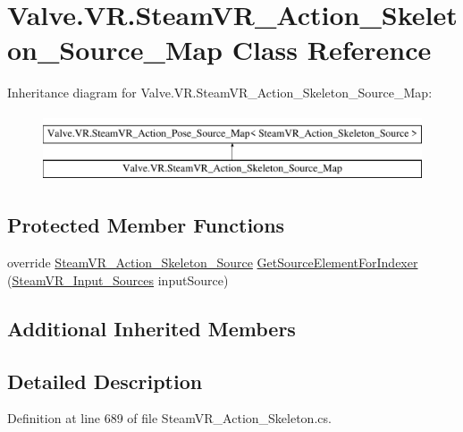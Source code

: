 \hypertarget{class_valve_1_1_v_r_1_1_steam_v_r___action___skeleton___source___map}{}\section{Valve.\+V\+R.\+Steam\+V\+R\+\_\+\+Action\+\_\+\+Skeleton\+\_\+\+Source\+\_\+\+Map Class Reference}
\label{class_valve_1_1_v_r_1_1_steam_v_r___action___skeleton___source___map}
Inheritance diagram for Valve.\+V\+R.\+Steam\+V\+R\+\_\+\+Action\+\_\+\+Skeleton\+\_\+\+Source\+\_\+\+Map\+:\begin{figure}[H]
\begin{center}
\leavevmode
\includegraphics[height=2.000000cm]{class_valve_1_1_v_r_1_1_steam_v_r___action___skeleton___source___map}
\end{center}
\end{figure}
\subsection*{Protected Member Functions}
\begin{DoxyCompactItemize}
\item 
override \mbox{\hyperlink{class_valve_1_1_v_r_1_1_steam_v_r___action___skeleton___source}{Steam\+V\+R\+\_\+\+Action\+\_\+\+Skeleton\+\_\+\+Source}} \mbox{\hyperlink{class_valve_1_1_v_r_1_1_steam_v_r___action___skeleton___source___map_a78146d0a428c0c497167e40b6fc4e5bc}{Get\+Source\+Element\+For\+Indexer}} (\mbox{\hyperlink{namespace_valve_1_1_v_r_a82e5bf501cc3aa155444ee3f0662853f}{Steam\+V\+R\+\_\+\+Input\+\_\+\+Sources}} input\+Source)
\end{DoxyCompactItemize}
\subsection*{Additional Inherited Members}


\subsection{Detailed Description}


Definition at line 689 of file Steam\+V\+R\+\_\+\+Action\+\_\+\+Skeleton.\+cs.



